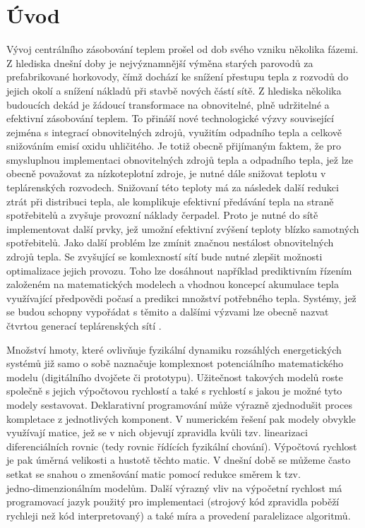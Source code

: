 \chapter{Úvod}
Vývoj centrálního zásobování teplem prošel od dob svého vzniku několika fázemi.
Z hlediska dnešní doby je nejvýznamnější výměna starých parovodů za
prefabrikované horkovody, čímž dochází ke snížení přestupu tepla z rozvodů do
jejich okolí a snížení nákladů při stavbě nových částí sítě. Z hlediska
několika budoucích dekád je žádoucí transformace na obnovitelné, plně
udržitelné a efektivní zásobování teplem. To přináší nové technologické výzvy
související zejména s integrací obnovitelných zdrojů, využitím odpadního tepla
a celkově snižováním emisí oxidu uhličitého. Je totiž obecně přijímaným faktem,
že pro smysluplnou implementaci obnovitelných zdrojů tepla a odpadního tepla,
jež lze obecně považovat za nízkoteplotní zdroje, je nutné dále snižovat
teplotu v teplárenských rozvodech. Snižovaní této teploty má za následek další
redukci ztrát při distribuci tepla, ale komplikuje efektivní předávání tepla na
straně spotřebitelů a zvyšuje provozní náklady čerpadel. Proto je nutné do sítě
implementovat další prvky, jež umožní efektivní zvýšení teploty blízko
samotných spotřebitelů. Jako další problém lze zmínit značnou nestálost
obnovitelných zdrojů tepla. Se zvyšující se komlexností sítí bude nutné zlepšit
možnosti optimalizace jejich provozu. Toho lze dosáhnout například prediktivním
řízením založeném na matematických modelech a vhodnou koncepcí akumulace tepla
využívající předpovědi počasí a predikci množství potřebného tepla. Systémy,
jež se budou schopny vypořádat s těmito a dalšími výzvami lze obecně nazvat
čtvrtou generací teplárenských sítí \cite{Lund2014}.

Množství hmoty, které ovlivňuje fyzikální dynamiku rozsáhlých energetických
systémů již samo o sobě naznačuje komplexnost potenciálního matematického
modelu (digitálního dvojčete či prototypu). Užitečnost takových modelů roste
společně s jejich výpočtovou rychlostí a také s rychlostí s jakou je možné tyto
modely sestavovat. Deklarativní programování může výrazně zjednodušit proces
kompletace z jednotlivých komponent. V numerickém řešení pak modely obvykle
využívají matice, jež se v nich objevují zpravidla kvůli tzv. linearizaci
diferenciálních rovnic (tedy rovnic řídících fyzikální chování). Výpočtová
rychlost je pak úměrná velikosti a hustotě těchto matic. V dnešní době se
můžeme často setkat se snahou o zmenšování matic pomocí redukce směrem k tzv.
jedno‑dimenzionálním modelům. Další výrazný vliv na výpočetní rychlost má
programovací jazyk použitý pro implementaci (strojový kód zpravidla poběží
rychleji než kód interpretovaný) a také míra a provedení paralelizace
algoritmů.

